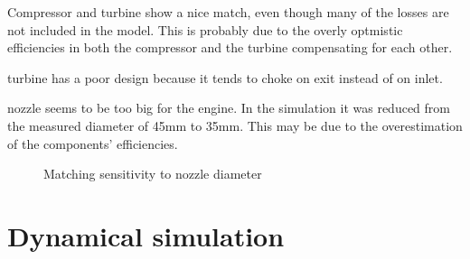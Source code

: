 \documentclass[tcc]{subfiles}
\begin{document}
Compressor and turbine show a nice match, even though many of the losses are not included in the model.
This is probably due to the overly optmistic efficiencies in both the compressor and the turbine compensating for each other.

turbine has a poor design because it tends to choke on exit instead of on inlet.

nozzle seems to be too big for the engine. In the simulation it was reduced from the measured diameter of 45mm to 35mm. This may be due to the overestimation of the components' efficiencies.

\begin{figure}
    \caption{Matching sensitivity to nozzle diameter}
\end{figure}

\section{Dynamical simulation}

\end{document}
